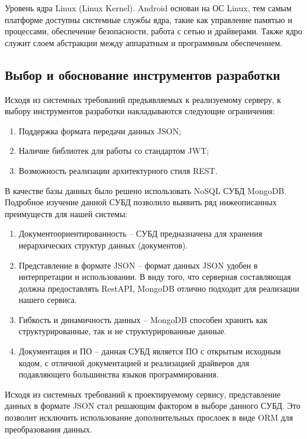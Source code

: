 Уровень ядра Linux (Linux Kernel). Android основан на ОС Linux, тем самым платформе доступны системные службы ядра, такие как управление памятью и процессами, обеспечение безопасности, работа с сетью и драйверами. Также ядро служит слоем абстракции между аппаратным и программным обеспечением.

\subsection{Выбор и обоснование инструментов разработки}

Исходя из системных требований предъявляемых к реализуемому серверу, к выбору инструментов разработки накладываются следующие ограничения:
\begin{enumerate}
	\item Поддержка формата передачи данных JSON;
	\item Наличие библиотек для работы со стандартом JWT;
	\item Возможность реализации архитектурного стиля REST.
\end{enumerate}

В качестве базы данных было решено использовать NoSQL СУБД MongoDB\cite{3}. Подробное изучение данной СУБД позволило выявить ряд нижеописанных преимуществ для нашей системы:
\begin{enumerate}
	\item Документоориентированность – СУБД предназначена для хранения иерархических структур данных (документов).
	\item Представление в формате JSON – формат данных JSON удобен в интерпретации и использовании. В виду того, что серверная составляющая должна предоставлять RestAPI, MongoDB отлично подходит для реализации нашего сервиса.
	\item Гибкость и динамичность данных – MongoDB способен хранить
	как структурированные, так и не структурированные данные.
	\item Документация и ПО – данная СУБД является ПО с открытым исходным кодом, с отличной документацией и реализацией драйверов для подавляющего большинства языков программирования.
\end{enumerate}

Исходя из системных требований к проектируемому сервису, представление данных в формате JSON стал решающим фактором в выборе данного СУБД. Это позволит исключить использование дополнительных прослоек в виде ORM для преобразования данных.

